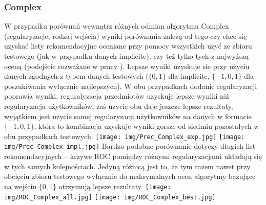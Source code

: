 \documentclass{pracamgr}
\begin{document}
    \subsubsection{Complex}
     W przypadku porównań wewnątrz różnych odmian algorytmu Complex (regularyzacje, rodzaj wejścia)
     wyniki porównania zależą od tego czy chce się uzyskać listy rekomendacyjne oceniane przy pomocy wszystkich
     uzyć ze zbioru testowego (jak w przypadku danych implicite), czy też tylko tych z najwyższą oceną (podejście rozważane w pracy \cite{205}).
     Lepsze wyniki uzyskuje sie przy użyciu danych zgodnych z typem danych testowych ($\{0,1\}$ dla implicite,
     $\{-1,0,1\}$ dla poszukiwania wyłącznie najlepszych). W obu przypadkach dodanie regularyzacji poprawia wyniki,
     reguralyzacja przedmiotów uzyskuje lepsze wyniki niż regularyzacja użytkowników, zaś uzycie obu daje jeszcze lepsze rezultaty,
     wyjątkiem jest użycie samej regularyzacji użytkowników na danych w formacie $\{-1,0,1\}$,
     która to kombinacja uzyskuje wyniki gorsze od siedmiu pozostałych w obu przypadkach testowych.\newline
     \texttt{[image: img/Prec\_Complex\_exp.jpg]}\newline
     \texttt{[image: img/Prec\_Complex\_impl.jpg]}\newline
     Bardzo podobne porównanie dotyczy długich list rekomendacyjnych -- krzywe ROC pomiędzy różnymi regularyzacjami układają się w tych samych kolejnościach.
     Jedyną różnicą jest to, że tym razem nawet przy obcięciu zbioru testowego wyłącznie do maksymalnych ocen algorytmy bazujące na wejściu $\{0,1\}$ otrzymują
     lepsze rezultaty.\newline
     \texttt{[image: img/ROC\_Complex\_all.jpg]}
     \texttt{[image: img/ROC\_Complex\_best.jpg]}\newline
\end{document}
